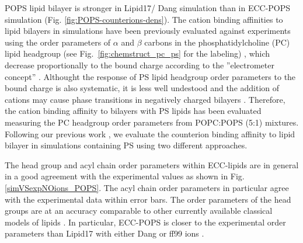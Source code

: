 \documentclass[journal=jpcbfk,manuscript=article]{achemso}
\begin{document}
POPS lipid bilayer is stronger in Lipid17/ Dang simulation than in
ECC-POPS simulation (Fig. \ref{fig:POPS-counterions-dens}).
The cation binding affinities to lipid bilayers in simulations have been previously evaluated
against experiments using the order parameters of $\alpha$ and $\beta$ carbons in the
phosphatidylcholine (PC) lipid headgroup (see Fig.~\ref{fig:chemstruct_pc_ps} for the labeling) \cite{catte16,melcr18,NMRlipidsIV},
which decrease proportionally to the bound charge according to the ''electrometer concept'' \citep{seelig87}.
Althought the response of PS lipid headgroup order parameters to the bound charge is also systematic,
it is less well undestood and the addition of cations may cause phase transitions in negatively charged
bilayers \cite{feigenson86,mattai89,roux91,roux90}. Therefore, the cation binding affinity to bilayers with
PS lipids has been evaluated measuring the PC headgroup order parameters from POPC:POPS (5:1)
mixtures\cite{roux90,NMRlipidsIV}.
Following our previous work \cite{NMRlipidsIV}, we evaluate the counterion binding affinity
to lipid bilayer in simulations containing PS using two different approaches.



 
The head group and acyl chain order parameters within ECC-lipids
are in general in a good agreement with the experimental values 
as shown in Fig. \ref{simVSexpNOions_POPS}. 
The acyl chain order parameters in particular agree with the experimental data within error bars.
The order parameters of the head groups are at an accuracy comparable to 
other currently available classical models of lipids \citep{botan15, catte16, Pluhackova2016, nmrlipids_proj4}. 
In particular, ECC-POPS is closer to the experimental order parameters 
than Lipid17 with either Dang \cite{smith94,chang1999,dang2006} 
or ff99 ions \citet{aqvist90}. 

\end{document}
